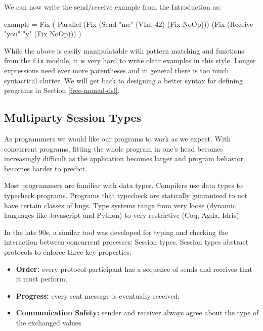 \documentclass[runningheads,plain]{llncs}
\providecommand{\tightlist}{%
  \setlength{\itemsep}{0pt}\setlength{\parskip}{0pt}}
\newenvironment{Shaded}{}{}
\newcommand{\DataTypeTok}[1]{\textcolor[rgb]{0.56,0.13,0.00}{#1}}
\newcommand{\DecValTok}[1]{\textcolor[rgb]{0.25,0.63,0.44}{#1}}
\newcommand{\StringTok}[1]{\textcolor[rgb]{0.25,0.44,0.63}{#1}}
\newcommand{\FunctionTok}[1]{\textcolor[rgb]{0.02,0.16,0.49}{#1}}
\newcommand{\NormalTok}[1]{#1}
\begin{document}
We can now write the send/receive example from the Introduction as:

\begin{Shaded}
\begin{Highlighting}[]
\NormalTok{example }\FunctionTok{=} 
    \DataTypeTok{Fix} 
\NormalTok{        ( }\DataTypeTok{Parallel} 
\NormalTok{            (}\DataTypeTok{Fix}\NormalTok{ (}\DataTypeTok{Send} \StringTok{"me"}\NormalTok{ (}\DataTypeTok{VInt} \DecValTok{42}\NormalTok{) (}\DataTypeTok{Fix} \DataTypeTok{NoOp}\NormalTok{)))}
\NormalTok{            (}\DataTypeTok{Fix}\NormalTok{ (}\DataTypeTok{Receive} \StringTok{"you"} \StringTok{"y"}\NormalTok{ (}\DataTypeTok{Fix} \DataTypeTok{NoOp}\NormalTok{)))}
\NormalTok{        )}
\end{Highlighting}
\end{Shaded}

While the above is easily manipulatable with pattern matching and
functions from the \texttt{Fix} module, it is very hard to write clear
examples in this style. Longer expressions need ever more parentheses
and in general there is too much syntactical clutter. We will get back
to designing a better syntax for defining programs in Section
\ref{free-monad-dsl}.

\subsection{Multiparty Session Types}\label{session-types}

As programmers we would like our programs to work as we expect. With
concurrent programs, fitting the whole program in one's head becomes
increasingly difficult as the application becomes larger and program
behavior becomes harder to predict.

Most programmers are familiar with data types. Compilers use data types
to typecheck programs. Programs that typecheck are statically guaranteed
to not have certain classes of bugs. Type systems range from very loose
(dynamic languages like Javascript and Python) to very restrictive (Coq,
Agda, Idris).

In the late 90s, a similar tool was developed for typing and checking
the interaction between concurrent processes: Session types. Session
types abstract protocols to enforce three key properties:

\begin{itemize}
\tightlist
\item
  \textbf{Order:} every protocol participant has a sequence of sends and
  receives that it must perform;
\item
  \textbf{Progress:} every sent message is eventually received;
\item
  \textbf{Communication Safety:} sender and receiver always agree about
  the type of the exchanged values
\end{itemize}
\end{document}
